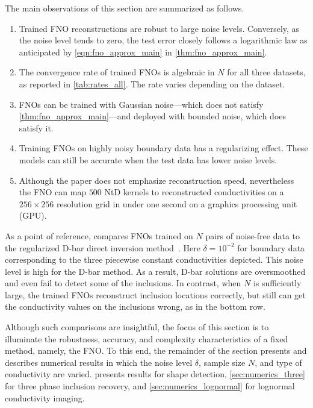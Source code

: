 \documentclass[pdflatex,sn-mathphys-num]{sn-jnl-preprint}
\theoremstyle{thmstyleone}%
\theoremstyle{thmstyletwo}%
\theoremstyle{thmstylethree}%
\numberwithin{equation}{section}
\numberwithin{theorem}{section}
\begin{document}
The main observations of this section are summarized as follows.
\begin{enumerate}[label=(O\arabic*),leftmargin=2.5\parindent,topsep=1.67ex,itemsep=0.5ex,partopsep=1ex,parsep=1ex]
    \item Trained FNO reconstructions are robust to large noise levels. Conversely, as the noise level tends to zero, the test error closely follows a logarithmic law as anticipated by \eqref{eqn:fno_approx_main} in \cref{thm:fno_approx_main}.

    \item The convergence rate of trained FNOs is algebraic in $N$ for all three datasets, as reported in \cref{tab:rates_all}. The rate varies depending on the dataset.

    \item FNOs can be trained with Gaussian noise---which does not satisfy \cref{thm:fno_approx_main}---and deployed with bounded noise, which does satisfy it.

    \item Training FNOs on highly noisy boundary data has a regularizing effect. These models can still be accurate when the test data has lower noise levels.

    \item Although the paper does not emphasize reconstruction speed, nevertheless the FNO can map $500$ NtD kernels to reconstructed conductivities on a $256\times 256$ resolution grid in under one second on a graphics processing unit (GPU).
\end{enumerate}

As a point of reference,  compares FNOs trained on $N$ pairs of noise-free data to the regularized D-bar direct inversion method~\cite{mueller2012linear,knudsen2009regularized,mueller2020d}. Here $\delta=10^{-2}$ for boundary data corresponding to the three piecewise constant conductivities depicted. This noise level is high for the D-bar method. As a result, D-bar solutions are oversmoothed and even fail to detect some of the inclusions. In contrast, when $N$ is sufficiently large, the trained FNOs reconstruct inclusion locations correctly, but still can get the conductivity values on the inclusions wrong, as in the bottom row. 

Although such comparisons are insightful, the focus of this section is to illuminate the robustness, accuracy, and complexity characteristics of a fixed method, namely, the FNO. To this end, the remainder of the section presents and describes numerical results in which the noise level $\delta$, sample size $N$, and type of conductivity are varied.  presents results for shape detection, \cref{sec:numerics_three} for three phase inclusion recovery, and \cref{sec:numerics_lognormal} for lognormal conductivity imaging.
\end{document}
